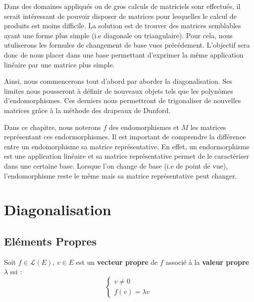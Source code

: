 


\minitoc  %

Dans des domaines appliqués ou de gros calculs de matriciels sonr effectués, il serait intéressant 
de pouvoir disposer de matrices pour lesquelles le calcul de produits est moins difficile. 
La solution est de trouver des matrices semblables ayant une forme plus simple (i.e diagonale ou triangulaire). 
Pour cela, nous utuliserons les formules de changement de base vues précédement. L'objectif sera donc de nous 
placer dans une base permettant d'exprimer la même application linéaire par une matrice plus simple. 

Ainsi, nous commencerons tout d'abord par aborder la diagonalisation. Ses limites nous pousseront à définir de nouveaux 
objets tels que les polynômes d'endomorphismes. Ces derniers nous permettront de trigonaliser de nouvelles matrices 
grâce à la méthode des drapeaux de Dunford. 

\begin{remark}[Notation]
    Dans ce chapitre, nous noterons $f$ des endomorphismes et $M$ les matrices représentant ces endormorphismes. 
    Il est important de comprendre la différence entre un endomorphisme sa matrice représentative. 
    En effet, un endormorphisme est une application linéaire et sa matrice représentative permet de le caractériser dans une certaine base. 
    Lorsque l'on change de base (i.e de point de vue), l'endomorphisme reste le même mais sa matrice représentative peut changer. 
\end{remark}


\section{Diagonalisation}

\subsection{Eléments Propres}

\begin{definition}
    Soit $ f \in \mathcal{L}(E)$, $v \in E$ est un \textbf{vecteur propre} de $f$ associé à la \textbf{valeur propre} $\lambda$ ssi :
    \[ 
        \begin{cases}
            v \not = 0 \\
            f(v) = \lambda v
        \end{cases}
    \]
\end{definition}

